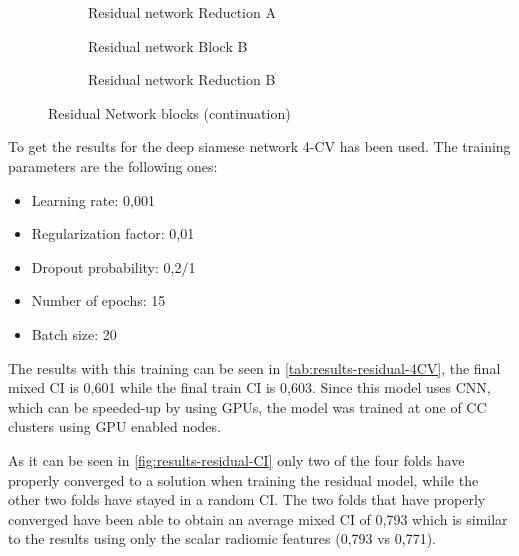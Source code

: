 \begin{figure}\ContinuedFloat
  \begin{subfigure}[b]{.55\textwidth}
    \centering
    \scalebox{.85}{}
    \caption{Residual network Reduction A \label{fig:residual-block-reduce-a}}
  \end{subfigure}
  \begin{subfigure}[b]{.44\textwidth}
    \centering
    \scalebox{.85}{}
    \caption{Residual network Block B \label{fig:residual-block-b}}
  \end{subfigure}

  \begin{subfigure}[b]{\textwidth}
    \centering
    \scalebox{.9}{}
    \caption{Residual network Reduction B \label{fig:residual-block-reduce-b}}
  \end{subfigure}
  \caption{Residual Network blocks (continuation)}
\end{figure}


To get the results for the deep siamese network 4-\gls{CV} has been used. The training
parameters are the following ones:
\begin{itemize}
  \item Learning rate: 0,001
  \item Regularization factor: 0,01
  \item Dropout probability: 0,2/1
  \item Number of epochs: 15
  \item Batch size: 20
\end{itemize}

The results with this training can be seen in \autoref{tab:results-residual-4CV}, the final
mixed \gls{CI} is 0,601 while the final train \gls{CI} is 0,603. Since this model uses 
\gls{CNN}, which can be speeded-up by using \glspl{GPU}, the model was trained at one of 
\gls{CC} clusters using \gls{GPU} enabled nodes.

As it can be seen in \autoref{fig:results-residual-CI} only two of the four folds have 
properly converged to a solution when training the residual model, while the other two folds
have stayed in a random \gls{CI}. The two folds that have properly converged have been able
to obtain an average mixed \gls{CI} of 0,793 which is similar to the results using only
the scalar radiomic features (0,793 vs 0,771).

